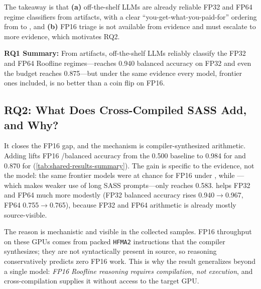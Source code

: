 

The takeaway is that \textbf{(a)} off-the-shelf LLMs are already reliable FP32 and FP64 regime classifiers from \sourceonly artifacts, with a clear ``you-get-what-you-paid-for'' ordering from \gptoss to \opus, and \textbf{(b)} FP16 triage is not available from \sourceonly evidence and must escalate to more evidence, which motivates RQ2.

\begin{rqsummary}
\textbf{RQ1 Summary:} From \sourceonly artifacts, off-the-shelf LLMs reliably classify the FP32 and FP64 Roofline regimes---\opus reaches 0.940 balanced accuracy on FP32 and even the budget \gptoss reaches 0.875---but under the same \sourceonly evidence every model, frontier ones included, is no better than a coin flip on FP16.
\end{rqsummary}






\subsection{RQ2: What Does Cross-Compiled SASS Add, and Why?}

It closes the FP16 gap, and the mechanism is compiler-synthesized arithmetic.
Adding \sourcesass lifts FP16 \bandwidthbound/\computebound balanced accuracy from the 0.500 \sourceonly baseline to 0.984 for \opus and 0.870 for \gptfivefour (\autoref{tab:shared-results-summary}).
The gain is specific to the evidence, not the model: the same frontier models were at chance for FP16 under \sourceonly, while \gptoss---which makes weaker use of long SASS prompts---only reaches 0.583.
\sourcesass helps FP32 and FP64 much more modestly (\opus FP32 balanced accuracy rises 0.940$\rightarrow$0.967, FP64 0.755$\rightarrow$0.765), because FP32 and FP64 arithmetic is already mostly source-visible.

The reason is mechanistic and visible in the collected samples.
FP16 throughput on these GPUs comes from packed \texttt{HFMA2} instructions that the compiler synthesizes; they are not syntactically present in source, so \sourceonly reasoning conservatively predicts zero FP16 work.
This is why the result generalizes beyond a single model: \textit{FP16 Roofline reasoning requires compilation, not execution}, and cross-compilation supplies it without access to the target GPU.

